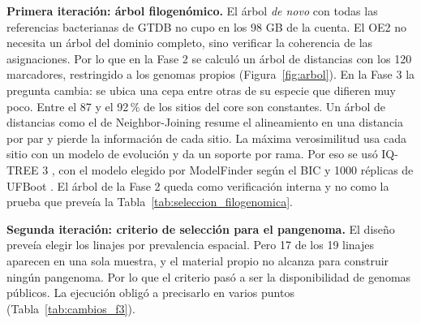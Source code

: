 \textbf{Primera iteración: árbol filogenómico.} El árbol \textit{de novo} con
todas las referencias bacterianas de GTDB no cupo en los 98 GB de la cuenta. El
OE2 no necesita un árbol del dominio completo, sino verificar la coherencia de
las asignaciones. Por lo que en la Fase 2 se calculó un árbol de distancias con
los 120 marcadores, restringido a los genomas propios
(Figura~\ref{fig:arbol}). En la Fase 3 la pregunta cambia: se ubica una cepa
entre otras de su especie que difieren muy poco. Entre el 87 y el 92\,\% de los
sitios del core son constantes. Un árbol de distancias como el de
Neighbor-Joining \cite{saitou1987} resume el alineamiento en una distancia por
par y pierde la información de cada sitio. La máxima verosimilitud
\cite{felsenstein1981} usa cada sitio con un modelo de evolución y da un soporte
por rama. Por eso se usó IQ-TREE 3 \cite{wong2026iqtree3}, con el modelo elegido
por ModelFinder \cite{kalyaanamoorthy2017modelfinder} según el BIC y 1000
réplicas de UFBoot \cite{hoang2018ufboot}. El árbol de la Fase 2 queda como
verificación interna y no como la prueba que preveía la
Tabla~\ref{tab:seleccion_filogenomica}.

\textbf{Segunda iteración: criterio de selección para el pangenoma.} El diseño
preveía elegir los linajes por prevalencia espacial. Pero 17 de los 19 linajes
aparecen en una sola muestra, y el material propio no alcanza para construir
ningún pangenoma. Por lo que el criterio pasó a ser la disponibilidad de genomas
públicos. La ejecución obligó a precisarlo en varios puntos
(Tabla~\ref{tab:cambios_f3}).

